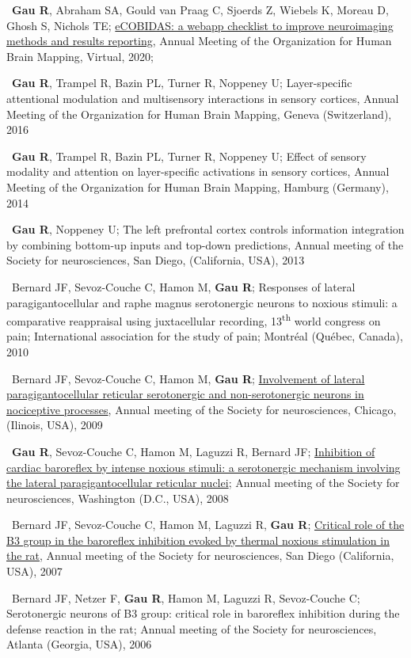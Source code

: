 \textbullet~\textbf{Gau R}, Abraham SA, Gould van Praag C, Sjoerds Z, Wiebels K, Moreau D, Ghosh S, Nichols TE;
\href{https://osf.io/k8pe6/}{eCOBIDAS: a webapp checklist to improve neuroimaging methods and results reporting}, 
Annual Meeting of the Organization for Human Brain Mapping, Virtual,  
2020; 

\textbullet~\textbf{Gau R}, Trampel R, Bazin PL, Turner R, Noppeney U; 
Layer-specific attentional modulation and multisensory interactions in sensory cortices, 
Annual Meeting of the Organization for Human Brain Mapping, Geneva (Switzerland), 
2016
\newline
{}

\textbullet~\textbf{Gau R}, Trampel R, Bazin PL, Turner R, Noppeney U; 
Effect of sensory modality and attention on layer-specific activations in sensory cortices, 
Annual Meeting of the Organization for Human Brain Mapping, Hamburg (Germany), 
2014
\newline
{}

\textbullet~\textbf{Gau R}, Noppeney U; The left prefrontal cortex controls information integration by combining bottom-up inputs and top-down predictions, 
Annual meeting of the Society for neurosciences, 
San Diego, (California, USA), 
2013
\newline
{}

\textbullet~Bernard JF, Sevoz-Couche C, Hamon M, \textbf{Gau R}; Responses of lateral paragigantocellular and raphe magnus serotonergic neurons to noxious stimuli: a comparative reappraisal using juxtacellular recording, 
13\textsuperscript{th} world congress on pain; International association for the study of pain; 
Montréal (Québec, Canada), 
2010

\textbullet~Bernard JF, Sevoz-Couche C, Hamon M, \textbf{Gau R}; \href{https://osf.io/efqub/}{Involvement of lateral paragigantocellular reticular serotonergic and non-serotonergic neurons in nociceptive processes}, 
Annual meeting of the Society for neurosciences, 
Chicago, (Ilinois, USA), 
2009

\textbullet~\textbf{Gau R}, Sevoz-Couche C, Hamon M, Laguzzi R, Bernard JF; 
\href{https://osf.io/hxkgv/}{Inhibition of cardiac baroreflex by intense noxious stimuli: a serotonergic mechanism involving the lateral paragigantocellular reticular nuclei}; 
Annual meeting of the Society for neurosciences, 
Washington (D.C., USA), 
2008

\textbullet~Bernard JF, Sevoz-Couche C, Hamon M, Laguzzi R, \textbf{Gau R}; 
\href{https://osf.io/4rjst/}{Critical role of the B3 group in the baroreflex inhibition evoked by thermal noxious stimulation in the rat}, 
Annual meeting of the Society for neurosciences, 
San Diego (California, USA), 
2007

\textbullet~Bernard JF, Netzer F, \textbf{Gau R}, Hamon M, Laguzzi R, Sevoz-Couche C; 
Serotonergic neurons of B3 group: critical role in baroreflex inhibition during the defense reaction in the rat; 
Annual meeting of the Society for neurosciences, 
Atlanta (Georgia, USA), 
2006
